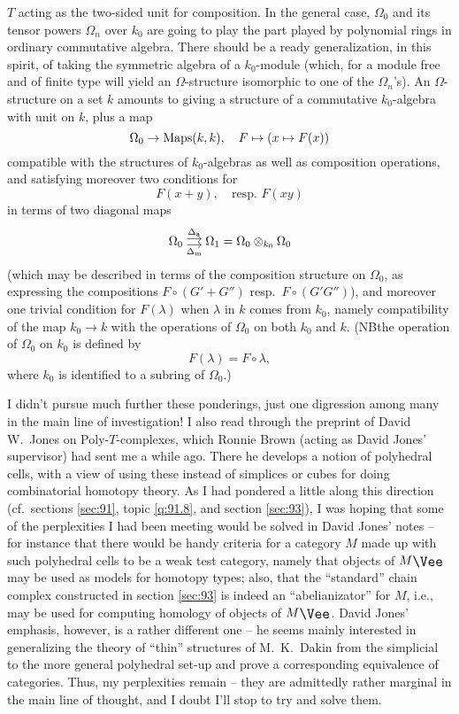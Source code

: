 $T$ acting as the two-sided unit for composition. In the general case,
$\Omega_0$ and its tensor powers $\Omega_n$ over $k_0$ are going to
play the part played by polynomial rings in ordinary commutative
algebra. There should be a ready generalization, in this spirit, of
taking the symmetric algebra of a $k_0$-module (which, for a module
free and of finite type will yield an $\Omega$-structure isomorphic to
one of the $\Omega_n$'s). An $\Omega$-structure on a set $k$ amounts
to giving a structure of a commutative $k_0$-algebra with unit on $k$,
plus a map
\[\Omega_0\to\operatorname{Maps}(k,k), \quad F\mapsto (x\mapsto F(x))\]
compatible with the structures of $k_0$-algebras as well
as composition operations, and satisfying moreover two conditions for
\[F(x+y), \quad\text{resp.~$F(xy)$}\]
in terms of two diagonal maps
\[
  \begin{tikzcd}[cramped,sep=small]
    \Omega_0 \ar[r,shift left,"\Delta\suba"]
    \ar[r,shift right,"\Delta\subm"'] &
    \Omega_1 = \Omega_0 \otimes_{k_0} \Omega_0
  \end{tikzcd}
\]
(which may be described in terms of the composition structure on
$\Omega_0$, as expressing the compositions $F\circ (G'+G'')$ resp.\
$F\circ(G'G'')$), and moreover one trivial condition for $F(\lambda)$
when $\lambda$ in $k$ comes from $k_0$, namely compatibility of the
map $k_0\to k$ with the operations of $\Omega_0$ on both $k_0$ and
$k$. (NB\enspace the operation of $\Omega_0$ on $k_0$ is defined by
\[F(\lambda)=F\circ\lambda,\]
where $k_0$ is identified to a subring of $\Omega_0$.)

I didn't pursue much further these ponderings, just one digression
among many in the main line of investigation! I also read through the
preprint of David W.\ Jones on
Poly-$T$-complexes, which Ronnie
Brown (acting as David Jones' supervisor) had sent me a while
ago. There he develops a notion of polyhedral cells, with a view of
using these instead of simplices or cubes for doing combinatorial
homotopy theory. As I had pondered a little along this direction (cf.\
sections \ref{sec:91}, topic \ref{q:91.8}, and section \ref{sec:93}),
I was hoping that some of the perplexities I had been meeting would be
solved in David Jones' notes -- for instance that there would be handy
criteria for a category $M$ made up with such polyhedral cells to be a
weak test category, namely that objects of $M\upvee$ may be used as
models for homotopy types; also, that the ``standard'' chain complex
constructed in section \ref{sec:93} is indeed an ``abelianizator'' for
$M$, i.e., may be used for computing homology of objects of
$M\upvee$. David Jones' emphasis, however, is a rather different one
-- he seems mainly interested in generalizing the theory of ``thin''
structures of M.~K.~Dakin\scrcomment{\textcite{Dakin1977}} from the
simplicial to the more general polyhedral set-up and prove a
corresponding equivalence of categories. Thus, my perplexities remain
-- they are admittedly rather marginal in the main line of thought,
and I doubt I'll stop to try and solve them.

